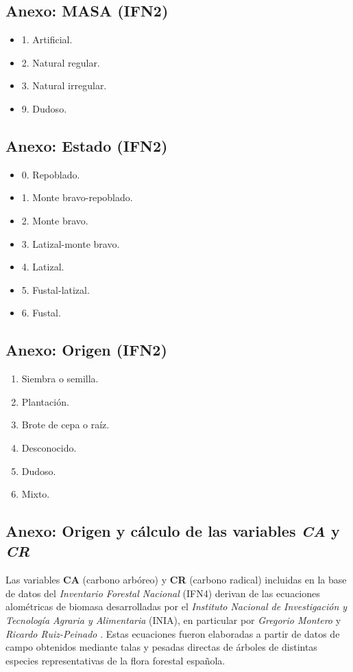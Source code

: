 \subsection{Anexo: MASA (IFN2)}\label{sec:masIFN2}
\begin{itemize}
    \item 1. Artificial.
    \item 2. Natural regular.
    \item 3. Natural irregular.
    \item 9. Dudoso.
\end{itemize}

\subsection{Anexo: Estado (IFN2)}\label{sec:EstadoIFN2}
\begin{itemize}
    \item 0. Repoblado. 
    \item 1. Monte bravo-repoblado. 
    \item 2. Monte bravo. 
    \item 3. Latizal-monte bravo. 
    \item 4. Latizal.
    \item 5. Fustal-latizal. 
    \item 6. Fustal.
\end{itemize}

\subsection{Anexo: Origen (IFN2)}\label{sec:OrigenIFN2}
\begin{enumerate}
    \item Siembra o semilla. 
    \item Plantación.
    \item Brote de cepa o raíz. 
    \item Desconocido.
    \item Dudoso. 
    \item Mixto.
\end{enumerate}



\subsection{Anexo: Origen y cálculo de las variables \textit{CA} y \textit{CR}}\label{sec:Carbono}

Las variables \textbf{CA} (carbono arbóreo) y \textbf{CR} (carbono radical) incluidas en la base de datos del \textit{Inventario Forestal Nacional} (IFN4) derivan de las ecuaciones alométricas de biomasa desarrolladas por el \textit{Instituto Nacional de Investigación y Tecnología Agraria y Alimentaria} (INIA), en particular por \textit{Gregorio Montero} y \textit{Ricardo Ruiz-Peinado} \cite{montero2009, ruizpeinado2011}. Estas ecuaciones fueron elaboradas a partir de datos de campo obtenidos mediante talas y pesadas directas de árboles de distintas especies representativas de la flora forestal española.

